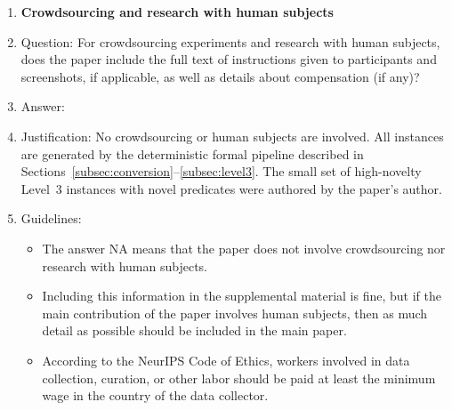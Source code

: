 \documentclass{article}
\theoremstyle{definition}
\begin{document}
\begin{enumerate}
\item {\bf Crowdsourcing and research with human subjects}
    \item[] Question: For crowdsourcing experiments and research with human subjects, does the paper include the full text of instructions given to participants and screenshots, if applicable, as well as details about compensation (if any)? 
    \item[] Answer: \answerNA{}
    \item[] Justification: No crowdsourcing or human subjects are involved. All instances are generated by the deterministic formal pipeline described in Sections~\ref{subsec:conversion}--\ref{subsec:level3}. The small set of high-novelty Level~3 instances with novel predicates were authored by the paper's author.
    \item[] Guidelines:
    \begin{itemize}
        \item The answer NA means that the paper does not involve crowdsourcing nor research with human subjects.
        \item Including this information in the supplemental material is fine, but if the main contribution of the paper involves human subjects, then as much detail as possible should be included in the main paper. 
        \item According to the NeurIPS Code of Ethics, workers involved in data collection, curation, or other labor should be paid at least the minimum wage in the country of the data collector. 
    \end{itemize}


\end{enumerate}
\end{document}
